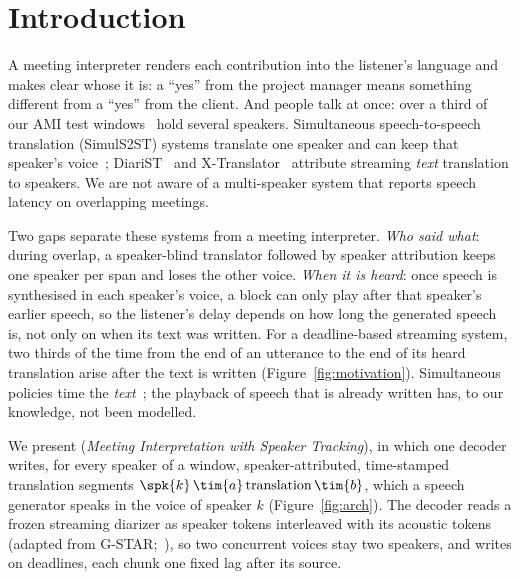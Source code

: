 \section{Introduction}
\label{sec:intro}



A meeting interpreter renders each contribution into the listener's language and makes clear whose it is: a
``yes'' from the project manager means something different from a ``yes'' from the client. And people talk at once:
over a third of our AMI test windows~\citep{carletta2005ami} hold several speakers. Simultaneous speech-to-speech
translation (SimulS2ST) systems translate one speaker and can keep that speaker's
voice~\citep{seamless2023,labiausse2025hibiki,cheng2025liveinterpret,deng2025simuls2s};
DiariST~\citep{yang2024diarist} and X-Translator~\citep{zhao2026xtranslator} attribute streaming \emph{text}
translation to speakers. We are not aware of a multi-speaker system that reports speech latency on overlapping
meetings.

Two gaps separate these systems from a meeting interpreter. \emph{Who said what}: during overlap, a speaker-blind
translator followed by speaker attribution keeps one speaker per span and loses the other voice. \emph{When it is
heard}: once speech is synthesised in each speaker's voice, a block can only play after that speaker's earlier speech,
so the listener's delay depends on how long the generated speech is, not only on when its text was written. For a
deadline-based streaming system, two thirds of the time from the end of an utterance to the end of its heard translation
arise after the text is written (Figure~\ref{fig:motivation}). Simultaneous policies time the
\emph{text}~\citep{ma2019stacl,arivazhagan2019milk,zhang2023hmt}; the playback of speech that is already written
has, to our knowledge, not been modelled.

We present \sys{} (\emph{Meeting Interpretation with Speaker Tracking}), in which one decoder writes, for every speaker
of a window, speaker-attributed, time-stamped translation segments $\spk{k}\,\tim{a}\,\text{translation}\,\tim{b}$,
which a speech generator speaks in the voice of speaker $k$ (Figure~\ref{fig:arch}). The decoder reads a frozen
streaming diarizer as speaker tokens interleaved with its acoustic tokens (adapted from G-STAR;~\citealp{peng2026gstar}),
so two concurrent voices stay two speakers, and writes on deadlines, each chunk one fixed lag after its source.

